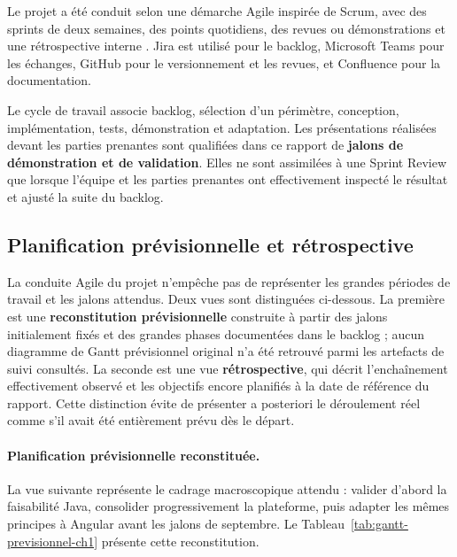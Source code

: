 Le projet a été conduit selon une démarche Agile inspirée de Scrum, avec des sprints de deux semaines, des points quotidiens, des revues ou démonstrations et une rétrospective interne \cite{scrum-guide}. Jira est utilisé pour le backlog, Microsoft Teams pour les échanges, GitHub pour le versionnement et les revues, et Confluence pour la documentation.

Le cycle de travail associe backlog, sélection d'un périmètre, conception, implémentation, tests, démonstration et adaptation. Les présentations réalisées devant les parties prenantes sont qualifiées dans ce rapport de \textbf{jalons de démonstration et de validation}. Elles ne sont assimilées à une Sprint Review que lorsque l'équipe et les parties prenantes ont effectivement inspecté le résultat et ajusté la suite du backlog.

\subsection{Planification prévisionnelle et rétrospective}

La conduite Agile du projet n'empêche pas de représenter les grandes périodes de travail et les jalons attendus. Deux vues sont distinguées ci-dessous. La première est une \textbf{reconstitution prévisionnelle} construite à partir des jalons initialement fixés et des grandes phases documentées dans le backlog ; aucun diagramme de Gantt prévisionnel original n'a été retrouvé parmi les artefacts de suivi consultés. La seconde est une vue \textbf{rétrospective}, qui décrit l'enchaînement effectivement observé et les objectifs encore planifiés à la date de référence du rapport. Cette distinction évite de présenter a posteriori le déroulement réel comme s'il avait été entièrement prévu dès le départ.

\paragraph{Planification prévisionnelle reconstituée.}
La vue suivante représente le cadrage macroscopique attendu : valider d'abord la faisabilité Java, consolider progressivement la plateforme, puis adapter les mêmes principes à Angular avant les jalons de septembre. Le Tableau~\ref{tab:gantt-previsionnel-ch1} présente cette reconstitution.

